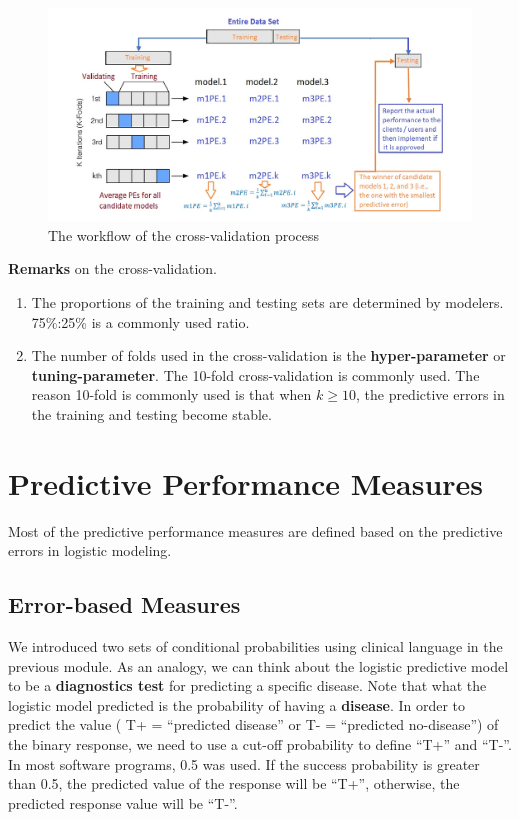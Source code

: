 \documentclass[
]{book}
\begin{document}
\begin{figure}

{\centering \includegraphics[width=0.9\linewidth]{img08/w08-CV-process} 

}

\caption{The workflow of the cross-validation process}\label{fig:unnamed-chunk-128}
\end{figure}

\textbf{Remarks} on the cross-validation.

\begin{enumerate}
\def\labelenumi{\arabic{enumi}.}
\item
  The proportions of the training and testing sets are determined by modelers. 75\%:25\% is a commonly used ratio.
\item
  The number of folds used in the cross-validation is the \textbf{hyper-parameter} or \textbf{tuning-parameter}. The 10-fold cross-validation is commonly used. The reason 10-fold is commonly used is that when \(k \ge 10\), the predictive errors in the training and testing become stable.
\end{enumerate}

\hypertarget{predictive-performance-measures}{%
\section{Predictive Performance Measures}\label{predictive-performance-measures}}

Most of the predictive performance measures are defined based on the predictive errors in logistic modeling.

\hypertarget{error-based-measures}{%
\subsection{Error-based Measures}\label{error-based-measures}}

We introduced two sets of conditional probabilities using clinical language in the previous module. As an analogy, we can think about the logistic predictive model to be a \textbf{diagnostics test} for predicting a specific disease. Note that what the logistic model predicted is the probability of having a \textbf{disease}. In order to predict the value ( T+ = ``predicted disease'' or T- = ``predicted no-disease'') of the binary response, we need to use a cut-off probability to define ``T+'' and ``T-''. In most software programs, 0.5 was used. If the success probability is greater than 0.5, the predicted value of the response will be ``T+'', otherwise, the predicted response value will be ``T-''.
\end{document}
